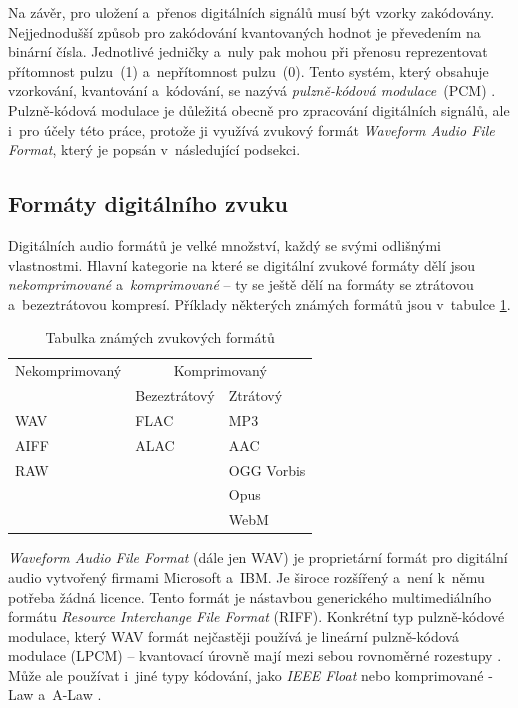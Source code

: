 Na závěr, pro uložení a~přenos digitálních signálů musí být vzorky zakódovány.
Nejjednodušší způsob pro zakódování kvantovaných hodnot je převedením na
binární čísla. Jednotlivé jedničky a~nuly pak mohou při přenosu reprezentovat
přítomnost pulzu~(1) a~nepřítomnost pulzu~(0). Tento systém, který obsahuje
vzorkování, kvantování a~kódování, se nazývá \textit{pulzně-kódová
modulace}~(PCM) \cite{Oliver1948}. Pulzně-kódová modulace je důležitá obecně
pro zpracování digitálních signálů, ale i~pro účely této práce, protože ji
využívá zvukový formát \textit{Waveform Audio File Format}, který je popsán
v~následující podsekci.

\subsection*{Formáty digitálního zvuku}
\label{sub:digital-audio-formats}

Digitálních audio formátů je velké množství, každý se svými odlišnými
vlastnostmi. Hlavní kategorie na které se digitální zvukové formáty dělí jsou
\textit{nekomprimované} a~\textit{komprimované} -- ty se ještě dělí na formáty
se ztrátovou a~bezeztrátovou kompresí. Příklady některých známých formátů jsou
v~tabulce \ref{tab:audio-formats}.

\begin{table}[H]
    \vskip6pt
    \caption{Tabulka známých zvukových formátů}
    \vskip6pt
    \centering
    \begin{tabular}{lll}
        \toprule
        Nekomprimovaný & \multicolumn{2}{c}{Komprimovaný} \\
        \cmidrule(r){2-3}
                       & Bezeztrátový & Ztrátový \\
        \midrule
        WAV  & FLAC & MP3 \\
        AIFF & ALAC & AAC \\
        RAW  &      & OGG Vorbis \\
             &      & Opus \\
             &      & WebM \\
        \bottomrule
    \end{tabular}
    \label{tab:audio-formats}
\end{table}

\textit{Waveform Audio File Format} (dále jen WAV) je proprietární formát pro
digitální audio vytvořený firmami Microsoft a~IBM. Je široce rozšířený a~není
k~němu potřeba žádná licence. Tento formát je nástavbou generického
multimediálního formátu \textit{Resource Interchange File Format} (RIFF).
Konkrétní typ pulzně-kódové modulace, který WAV formát nejčastěji používá je
lineární pulzně-kódová modulace (LPCM) \cite{RFC2361} -- kvantovací úrovně mají
mezi sebou rovnoměrné rozestupy \cite{LPCM}. Může ale používat i~jiné typy
kódování, jako \textit{IEEE Float} nebo komprimované \textmu-Law a~A-Law
\cite{RFC2361}.

